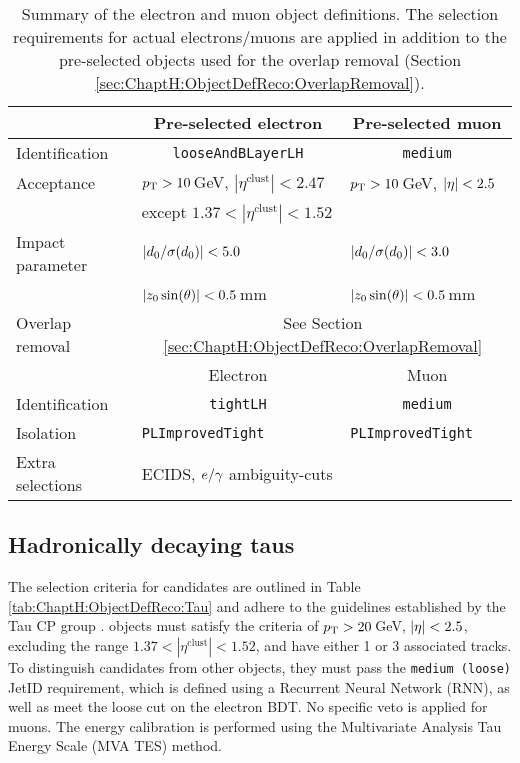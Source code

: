 

\begin{table}[!htbp]
  \begin{tabular}{ l|l|l }
    \toprule
    & \multicolumn{1}{c|}{Pre-selected electron} & \multicolumn{1}{c}{Pre-selected muon} \\
    \midrule
    Identification   & \multicolumn{1}{c|}{\texttt{looseAndBLayerLH}} & \multicolumn{1}{c}{\texttt{medium}} \\
    Acceptance       & $p_{\text{T}} > 10\,$GeV, $|\eta^\mathrm{clust}| < 2.47$  & $p_{\text{T}} > 10\,$GeV, $|\eta| < 2.5$ \\
                     &  except $1.37 < |\eta^\mathrm{clust}| < 1.52$          & \\
    Impact parameter & $|d_{0}/\sigma(d_{0})| < 5.0$                   & $|d_{0}/\sigma(d_{0})| < 3.0$ \\
                     & $|z_{0} \sin(\theta)| < 0.5\,$mm                      & $|z_{0} \sin(\theta)| < 0.5\,$mm \\
     Overlap removal & \multicolumn{2}{c}{See Section \ref{sec:ChaptH:ObjectDefReco:OverlapRemoval}} \\
    \bottomrule
    & \multicolumn{1}{c|}{Electron} & \multicolumn{1}{c}{Muon} \\
    \midrule
    Identification   & \multicolumn{1}{c|}{\texttt{tightLH}} &  \multicolumn{1}{c}{\texttt{medium}}\\
    Isolation        & \texttt{PLImprovedTight}  & \texttt{PLImprovedTight} \\
    Extra selections & ECIDS, $e/\gamma$ ambiguity-cuts &  \\
    \bottomrule
  \end{tabular}
  \caption{Summary of the electron and muon object definitions. The selection requirements for actual
          electrons/muons are applied in addition to the pre-selected objects used for the overlap removal 
          (Section \ref{sec:ChaptH:ObjectDefReco:OverlapRemoval}).}
   \label{tab:ChaptH:ObjectDefReco:Electrons_Muons}
\end{table}


%
%
\subsection{Hadronically decaying taus}
\label{sec:ChaptH:ObjectDefReco:tau}
The selection criteria for \tauhad candidates are outlined in Table \ref{tab:ChaptH:ObjectDefReco:Tau} 
and adhere to the guidelines established by the Tau CP group \cite{TauRecommendations}. 
\tauhad objects must satisfy the criteria of $p_{\text{T}} > 20\,$GeV, $|\eta| < 2.5$, excluding the range 
$1.37 < |\eta^\mathrm{clust}| < 1.52$, and have either 1 or 3 associated tracks. 
To distinguish \tauhad candidates from other objects, they must pass the \texttt{medium (loose)} JetID 
requirement, which is defined using a Recurrent Neural Network (RNN), as well as meet the loose cut 
on the electron BDT. No specific veto is applied for muons. The energy calibration is performed using 
the Multivariate Analysis Tau Energy Scale (MVA TES) method.

